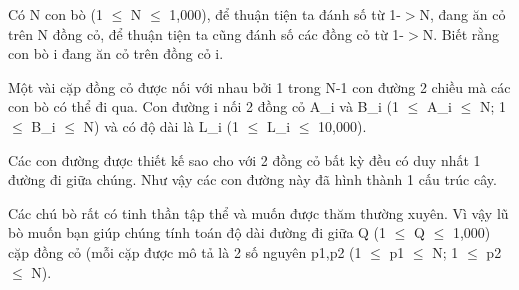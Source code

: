 Có N con bò (1  $\le$  N  $\le$  1,000), để thuận tiện ta đánh số từ 1-$>$N, đang ăn cỏ trên N đồng cỏ, để thuận tiện ta cũng đánh số các đồng cỏ từ 1-$>$N. Biết rằng con bò i đang ăn cỏ trên đồng cỏ i.  

   Một vài cặp đồng cỏ được nối với nhau bởi 1 trong N-1 con đường 2 chiều mà các con bò có thể đi qua. Con đường i nối 2 đồng cỏ A\_i và B\_i (1  $\le$  A\_i  $\le$  N; 1  $\le$  B\_i  $\le$  N) và có độ dài là L\_i (1  $\le$  L\_i  $\le$  10,000).  

   Các con đường được thiết kế sao cho với 2 đồng cỏ bất kỳ đều có duy nhất 1 đường đi giữa chúng. Như vậy các con đường này đã hình thành 1 cấu trúc cây.  

   Các chú bò rất có tinh thần tập thể và muốn được thăm thường xuyên. Vì vậy lũ bò muốn bạn giúp chúng tính toán độ dài đường đi giữa Q (1  $\le$  Q  $\le$  1,000) cặp đồng cỏ (mỗi cặp được mô tả là 2 số nguyên p1,p2 (1  $\le$  p1  $\le$  N; 1  $\le$  p2  $\le$  N).